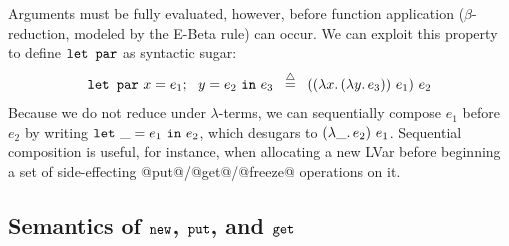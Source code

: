 \documentclass{article}
\begin{document}
Arguments must be fully evaluated, however, before function
application ($\beta$-reduction, modeled by the {\sc E-Beta} rule) can
occur.  We can exploit this property to define $\mbox{\texttt{\mbox{\texttt{let}}~\mbox{\texttt{par}}}}$ as syntactic
sugar:
\[
\mbox{\texttt{\mbox{\texttt{let}}~\mbox{\texttt{par}}}} ~x = e_1;~~y = e_2~\mbox{\texttt{in}}~e_3 \;\;\stackrel{\triangle}{=}\;\;
((\lambda x.\,(\lambda y.\,e_3))~e_1)~e_2
\]
Because we do not reduce under $\lambda$-terms, we can sequentially
compose $e_1$ before $e_2$ by writing $\mbox{\texttt{let}}~\_=e_1~\mbox{\texttt{in}}~e_2$, which
desugars to $(\lambda\_.\,e_2)~e_1$.  Sequential composition is
useful, for instance, when allocating a new LVar before beginning a
set of side-effecting @put@/@get@/@freeze@ operations on it.

\subsection{Semantics of $\mbox{\texttt{new}}$, $\mbox{\texttt{put}}$, and $\mbox{\texttt{get}}$}\label{subsection:newputget}
\end{document}
